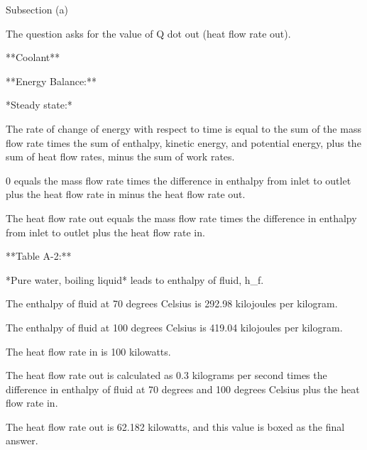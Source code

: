 Subsection (a)

The question asks for the value of Q dot out (heat flow rate out).

**Coolant**

**Energy Balance:**

*Steady state:*

The rate of change of energy with respect to time is equal to the sum of the mass flow rate times the sum of enthalpy, kinetic energy, and potential energy, plus the sum of heat flow rates, minus the sum of work rates.

0 equals the mass flow rate times the difference in enthalpy from inlet to outlet plus the heat flow rate in minus the heat flow rate out.

The heat flow rate out equals the mass flow rate times the difference in enthalpy from inlet to outlet plus the heat flow rate in.

**Table A-2:**

*Pure water, boiling liquid* leads to enthalpy of fluid, h_f.

The enthalpy of fluid at 70 degrees Celsius is 292.98 kilojoules per kilogram.

The enthalpy of fluid at 100 degrees Celsius is 419.04 kilojoules per kilogram.

The heat flow rate in is 100 kilowatts.

The heat flow rate out is calculated as 0.3 kilograms per second times the difference in enthalpy of fluid at 70 degrees and 100 degrees Celsius plus the heat flow rate in.

The heat flow rate out is 62.182 kilowatts, and this value is boxed as the final answer.